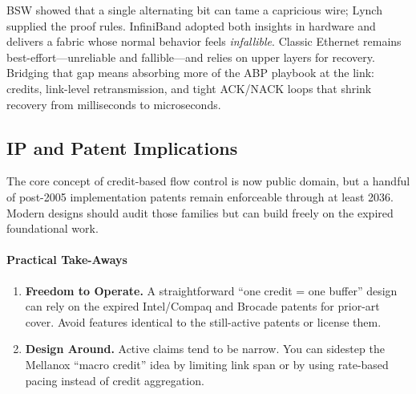 \documentclass[../../../OAE-SPEC-MAIN.tex]{subfiles}
\begin{document}
\begin{highlightbox}[]
\noindent
BSW showed that a single alternating bit can tame a capricious wire; Lynch
supplied the proof rules.  InfiniBand adopted both insights in hardware and
delivers a fabric whose normal behavior feels \emph{infallible}.  Classic
Ethernet remains best-effort---unreliable and fallible---and relies on upper
layers for recovery.  Bridging that gap means absorbing more of the ABP
playbook at the link: credits, link-level retransmission, and tight ACK/NACK
loops that shrink recovery from milliseconds to microseconds.
\end{highlightbox}


\subsection{IP and Patent Implications}

The core concept of credit-based flow control is now public domain, but a
handful of post-2005 implementation patents remain enforceable through
at least 2036.  Modern designs should audit those families but can build
freely on the expired foundational work.


\paragraph{Practical Take-Aways}
\begin{enumerate}
\item \textbf{Freedom to Operate.}  A straightforward ``one credit = one
buffer'' design can rely on the expired Intel/Compaq and Brocade patents
for prior-art cover.  Avoid features identical to the still-active
patents or license them.
\item \textbf{Design Around.}  Active claims tend to be narrow.  You can
sidestep the Mellanox ``macro credit'' idea by limiting link span or by
using rate-based pacing instead of credit aggregation.
\end{enumerate}
\end{document}
